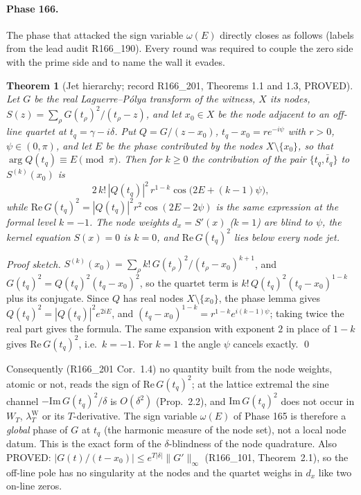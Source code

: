 \documentclass[11pt]{amsart}
\newtheorem{theorem}{Theorem}[section]
\theoremstyle{definition}
\theoremstyle{remark}
\newcommand{\lamW}{\lambda^{\mathrm W}_T}
\begin{document}
\paragraph{Phase 166.} The phase that attacked the sign variable $\omega(E)$ directly closes as follows (labels from the lead audit
R166\_190). Every round was required to couple the zero side with the prime side and to name the wall it evades.

\begin{theorem}[Jet hierarchy; record R166\_201, Theorems 1.1 and 1.3, PROVED]\label{thm:jet}
Let $G$ be the real Laguerre--P\'olya transform of the witness, $X$ its nodes, $S(z)=\sum_\rho G(t_\rho)^2/(t_\rho-z)$, and let
$x_0\in X$ be the node adjacent to an off-line quartet at $t_q=\gamma-i\delta$. Put $Q=G/(z-x_0)$, $t_q-x_0=re^{-i\psi}$ with $r>0$,
$\psi\in(0,\pi)$, and let $E$ be the phase contributed by the nodes $X\setminus\{x_0\}$, so that $\arg Q(t_q)\equiv E\pmod\pi$. Then for
$k\ge0$ the contribution of the pair $\{t_q,\bar t_q\}$ to $S^{(k)}(x_0)$ is
\[
2\,k!\,|Q(t_q)|^2\,r^{1-k}\cos\bigl(2E+(k-1)\psi\bigr),
\]
while $\mathrm{Re}\,G(t_q)^2=|Q(t_q)|^2r^2\cos(2E-2\psi)$ is the same expression at the formal level $k=-1$. The node weights
$d_x=S'(x)$ ($k=1$) are blind to $\psi$, the kernel equation $S(x)=0$ is $k=0$, and $\mathrm{Re}\,G(t_q)^2$ lies below every node jet.
\end{theorem}

\noindent\emph{Proof sketch.} $S^{(k)}(x_0)=\sum_\rho k!\,G(t_\rho)^2/(t_\rho-x_0)^{k+1}$, and $G(t_q)^2=Q(t_q)^2(t_q-x_0)^2$, so the
quartet term is $k!\,Q(t_q)^2(t_q-x_0)^{1-k}$ plus its conjugate. Since $Q$ has real nodes $X\setminus\{x_0\}$, the phase lemma gives
$Q(t_q)^2=|Q(t_q)|^2e^{2iE}$, and $(t_q-x_0)^{1-k}=r^{1-k}e^{i(k-1)\psi}$; taking twice the real part gives the formula. The same
expansion with exponent $2$ in place of $1-k$ gives $\mathrm{Re}\,G(t_q)^2$, i.e.\ $k=-1$. For $k=1$ the angle $\psi$ cancels
exactly. \qed

\noindent Consequently (R166\_201 Cor.~1.4) no quantity built from the node weights, atomic or not, reads the sign of
$\mathrm{Re}\,G(t_q)^2$; at the lattice extremal the sine channel $-\mathrm{Im}\,G(t_q)^2/\delta$ is $O(\delta^2)$ (Prop.~2.2), and
$\mathrm{Im}\,G(t_q)^2$ does not occur in $W_T$, $\lamW$ or its $T$-derivative. The sign variable $\omega(E)$ of Phase 165 is therefore a
\emph{global} phase of $G$ at $t_q$ (the harmonic measure of the node set), not a local node datum. This is the exact form of the
$\delta$-blindness of the node quadrature. Also PROVED: $|G(t)/(t-x_0)|\le e^{T|\delta|}\|G'\|_\infty$ (R166\_101, Theorem~2.1), so the
off-line pole has no singularity at the nodes and the quartet weighs in $d_x$ like two on-line zeros.
\end{document}
